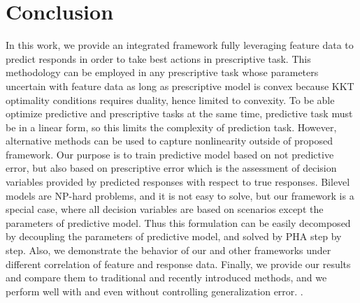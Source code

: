 \documentclass[12pt]{article}
\begin{document}
\section{Conclusion}
In this work, we provide an integrated framework fully leveraging feature data to predict responds in order to take best actions in prescriptive task. This methodology can be employed in any prescriptive task whose parameters uncertain with feature data as long as prescriptive model is convex because KKT optimality conditions requires duality, hence limited to convexity. To be able optimize predictive and prescriptive tasks at the same time, predictive task must be in a linear form, so this limits the complexity of prediction task. However, alternative methods can be used to capture nonlinearity outside of proposed framework. Our purpose is to train predictive model based on not predictive error, but also based on prescriptive error which is the assessment of decision variables provided by predicted responses with respect to true responses. Bilevel models are NP-hard problems, and it is not easy to solve, but our framework is a special case, where all decision variables are based on scenarios except the parameters of predictive model. Thus this formulation can be easily decomposed by decoupling the parameters of predictive model, and solved by PHA step by step. Also, we demonstrate the behavior of our and other frameworks under different correlation of feature and response data. Finally, we provide our results and compare them to traditional and recently introduced methods, and we perform well with and even without controlling generalization error.
.\\



\clearpage

\clearpage
\end{document}
